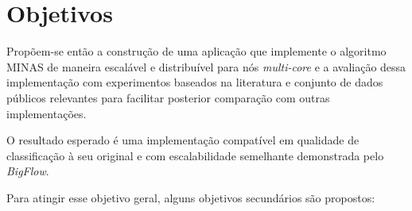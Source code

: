 \section{Objetivos}

% 

Propõem-se então a construção de uma aplicação que implemente o algoritmo MINAS
de maneira escalável e distribuível para nós \emph{multi-core} e a avaliação
dessa implementação com experimentos baseados na literatura e conjunto de dados
públicos relevantes para facilitar posterior comparação com outras
implementações.

O resultado esperado é uma implementação compatível em qualidade de
classificação à seu original e com escalabilidade semelhante demonstrada pelo
\emph{BigFlow}.



Para atingir esse objetivo geral, alguns objetivos secundários são propostos:


